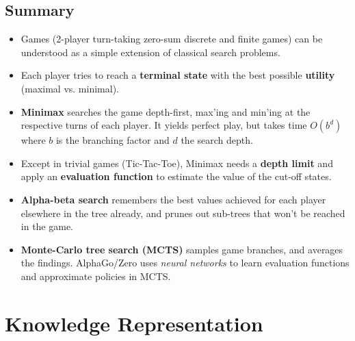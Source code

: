 \documentclass[conference]{styles/acmsiggraph}
\begin{document}
    \subsection{Summary}
        \begin{itemize}
            \item Games (2-player turn-taking zero-sum discrete and finite games) can be understood as a simple extension of classical search problems.
            \item Each player tries to reach a \textbf{terminal state} with the best possible \textbf{utility} (maximal vs. minimal).
            \item \textbf{Minimax} searches the game depth-first, max'ing and min'ing at the respective turns of each player. 
                It yields perfect play, but takes time $O(b^d)$ where $b$ is the branching factor and $d$ the search depth.
            \item Except in trivial games (Tic-Tac-Toe), Minimax needs a \textbf{depth limit} and apply an \textbf{evaluation function} to estimate the value of the cut-off states.
            \item \textbf{Alpha-beta search} remembers the best values achieved for each player elsewhere in the tree already, and prunes out sub-trees that won't be reached in the game.
            \item \textbf{Monte-Carlo tree search (MCTS)} samples game branches, and averages the findings. 
                AlphaGo/Zero uses \textit{neural networks} to learn evaluation functions and approximate policies in MCTS.
        \end{itemize}

\newpage    
    
\section{Knowledge Representation}
\end{document}
